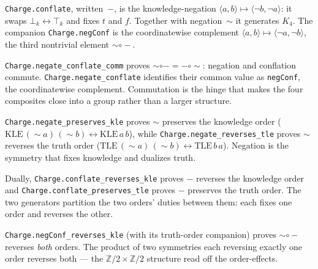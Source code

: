 \begin{definition}\label{def:conflate}\leanok{}
\texttt{Charge.conflate}, written~$-$, is the knowledge-negation $\langle a, b\rangle \mapsto \langle \neg b, \neg a\rangle$: it swaps $\bot_k \leftrightarrow \top_k$ and fixes $t$ and $f$. Together with negation~$\sim$ it generates $K_4$. The companion \texttt{Charge.negConf} is the coordinatewise complement $\langle a, b\rangle \mapsto \langle \neg a, \neg b\rangle$, the third nontrivial element ${\sim}\circ{-}$.
\end{definition}

\begin{theorem}\label{thm:negate-conflate-comm}\leanok{}
\texttt{Charge.negate\_conflate\_comm} proves ${\sim}\circ{-} = {-}\circ{\sim}$: negation and conflation commute. \texttt{Charge.negate\_conflate} identifies their common value as \texttt{negConf}, the coordinatewise complement. Commutation is the hinge that makes the four composites close into a group rather than a larger structure.
\end{theorem}

\begin{theorem}\label{thm:negate-orders}\leanok{}
\texttt{Charge.negate\_preserves\_kle} proves $\sim$ preserves the knowledge order ($\mathrm{KLE}\,({\sim}a)\,({\sim}b) \leftrightarrow \mathrm{KLE}\,a\,b$), while \texttt{Charge.negate\_reverses\_tle} proves $\sim$ reverses the truth order ($\mathrm{TLE}\,({\sim}a)\,({\sim}b) \leftrightarrow \mathrm{TLE}\,b\,a$). Negation is the symmetry that fixes knowledge and dualizes truth.
\end{theorem}

\begin{theorem}\label{thm:conflate-orders}\leanok{}
Dually, \texttt{Charge.conflate\_reverses\_kle} proves $-$ reverses the knowledge order and \texttt{Charge.conflate\_preserves\_tle} proves $-$ preserves the truth order. The two generators partition the two orders' duties between them: each fixes one order and reverses the other.
\end{theorem}

\begin{theorem}\label{thm:negconf-reverses}\leanok{}
\texttt{Charge.negConf\_reverses\_kle} (with its truth-order companion) proves ${\sim}\circ{-}$ reverses \emph{both} orders. The product of two symmetries each reversing exactly one order reverses both --- the $\mathbb{Z}/2 \times \mathbb{Z}/2$ structure read off the order-effects.
\end{theorem}

